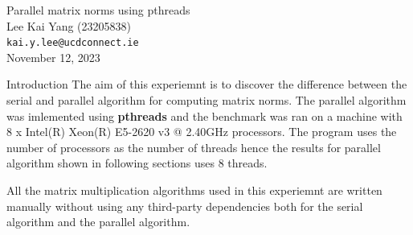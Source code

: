 \documentclass[12pt]{article}
\begin{document}
\begin{center}
    {\LARGE Parallel matrix norms using pthreads} \\[0.6cm]

    Lee Kai Yang (23205838) \\
    \texttt{\small kai.y.lee@ucdconnect.ie} \\[0.3cm]

    \small November 12, 2023
\end{center}

\begin{section}{Introduction}
 The aim of this experiemnt is to discover the difference between the serial and parallel algorithm for computing matrix norms. The
 parallel algorithm was imlemented using \textbf{pthreads} and the benchmark was ran on a machine with 8 x Intel(R) Xeon(R) E5-2620 v3 @ 2.40GHz processors.
 The program uses the number of processors as the number of threads hence the results for parallel algorithm shown in following sections uses 8 threads.

 All the matrix multiplication algorithms used in this experiemnt are written manually without using any third-party dependencies both for
 the serial algorithm and the parallel algorithm.
\end{section}
\end{document}

